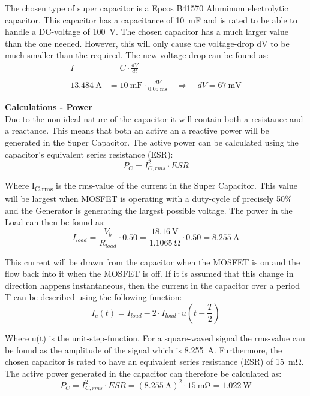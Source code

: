 The chosen type of super capacitor is a Epcos B41570 Aluminum electrolytic capacitor\cite{SuperCapacitor}. This capacitor has a capacitance of \SI{10}{\milli \farad} and is rated to be able to handle a DC-voltage of \SI{100}{\volt}. The chosen capacitor has a much larger value than the one needed. However, this will only cause the voltage-drop dV to be much smaller than the required. The new voltage-drop can be found as:
\begin{equation}
	\begin{split}
		I &= C \cdot \frac{dV}{dt}\\
		\\
	\SI{13.484}{\ampere} &= \SI{10}{\milli \farad} \cdot \frac{dV}{\SI{0.05}{\milli \second}} \quad \Rightarrow \quad dV = \SI{67}{\milli \volt}
	\end{split}
\end{equation}

\textbf{Calculations - Power}\\
Due to the non-ideal nature of the capacitor it will contain both a resistance and a reactance. This means that both an active an a reactive power will be generated in the Super Capacitor. The active power can be calculated using the capacitor's equivalent series resistance (ESR)\cite{SuperCapacitor}:
\begin{equation}
	P_C = I_{C,rms}^2 \cdot ESR
\end{equation}

Where I\textsubscript{C,rms} is the rms-value of the current in the Super Capacitor. This value will be largest when MOSFET is operating with a duty-cycle of precisely 50\% and the Generator is generating the largest possible voltage. The power in the Load can then be found as:
\begin{equation}
	I_{load} = \frac{V_b}{R_{load}} \cdot 0.50 = \frac{\SI{18.16}{\volt}}{\SI{1.1065}{\ohm}} \cdot 0.50 = \SI{8.255}{\ampere}
\end{equation}

This current will be drawn from the capacitor when the MOSFET is on and the flow back into it when the MOSFET is off. If it is assumed that this change in direction happens instantaneous, then the current in the capacitor over a period T can be described using the following function:
\begin{equation}
	I_c(t) = I_{load} - 2 \cdot I_{load} \cdot u \left( t - \frac{T}{2} \right)
\end{equation}

Where u(t) is the unit-step-function. For a square-waved signal the rms-value can be found as the amplitude of the signal which is \SI{8.255}{\ampere}. Furthermore, the chosen capacitor is rated to have an equivalent series resistance (ESR) of \SI{15}{\milli \ohm}. The active power generated in the capacitor can therefore be calculated as:
\begin{equation}
	P_C = I_{C,rms}^2 \cdot ESR = (\SI{8.255}{\ampere})^2 \cdot \SI{15}{\milli \ohm} = \SI{1.022}{\watt}
\end{equation}

